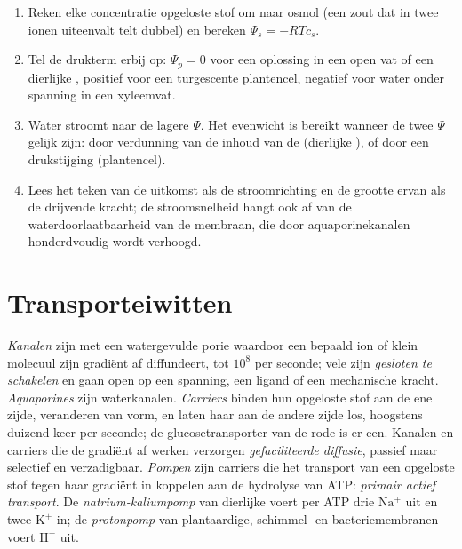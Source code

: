 \begin{method}\label{met:b1:membranes-transport:psi}
\begin{enumerate}
  \item Reken elke concentratie opgeloste stof om naar osmol (een zout dat
        in twee ionen uiteenvalt telt dubbel) en bereken $\Psi_s =
        -RTc_s$.
  \item Tel de drukterm erbij op: $\Psi_p = 0$ voor een oplossing in een
        open vat of een dierlijke , positief voor een turgescente
        plantencel, negatief voor water onder spanning in een xyleemvat.
  \item Water stroomt naar de lagere $\Psi$. Het evenwicht is bereikt
        wanneer de twee $\Psi$ gelijk zijn: door verdunning van de inhoud
        van de  (dierlijke ), of door een drukstijging
        (plantencel).
  \item Lees het teken van de uitkomst als de stroomrichting en de grootte
        ervan als de drijvende kracht; de stroomsnelheid hangt ook af van
        de waterdoorlaatbaarheid van de membraan, die door
        aquaporinekanalen honderdvoudig wordt verhoogd.
\end{enumerate}
\end{method}

\section{Transporteiwitten}

\begin{definition}\label{def:b1:membranes-transport:transporters}
\emph{Kanalen} zijn  met een watergevulde porie
waardoor een bepaald ion of klein molecuul zijn gradiënt af diffundeert, tot
$10^8$ per seconde; vele zijn \emph{gesloten te schakelen} en gaan open op een
spanning, een ligand of een mechanische kracht.
\emph{Aquaporines} zijn waterkanalen.
\emph{Carriers} binden hun opgeloste stof aan de ene zijde,
veranderen van vorm, en laten haar aan de andere zijde los, hoogstens duizend keer
per seconde; de glucosetransporter van de rode  is er een. Kanalen en carriers
die de gradiënt af werken verzorgen \emph{gefaciliteerde
diffusie}, passief maar selectief en verzadigbaar.
\emph{Pompen} zijn carriers die het transport van een opgeloste stof
tegen haar gradiënt in koppelen aan de hydrolyse van ATP: \emph{primair actief
transport}. De
\emph{natrium-kaliumpomp} van dierlijke  voert
per ATP drie $\mathrm{Na^+}$ uit en twee $\mathrm{K^+}$ in; de
\emph{protonpomp} van plantaardige, schimmel- en bacteriemembranen voert
$\mathrm{H^+}$ uit.
\end{definition}

